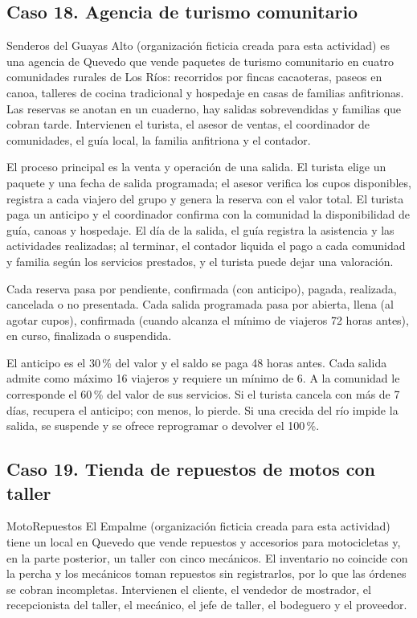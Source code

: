\documentclass[11pt]{article}
\newcommand{\subseccion}[1]{\subsection{\textcolor{midblue}{#1}}}
\begin{document}
\subseccion{Caso 18. Agencia de turismo comunitario}
Senderos del Guayas Alto (organización ficticia creada para esta actividad) es una agencia de Quevedo que vende paquetes de turismo comunitario en cuatro comunidades rurales de Los Ríos: recorridos por fincas cacaoteras, paseos en canoa, talleres de cocina tradicional y hospedaje en casas de familias anfitrionas. Las reservas se anotan en un cuaderno, hay salidas sobrevendidas y familias que cobran tarde. Intervienen el turista, el asesor de ventas, el coordinador de comunidades, el guía local, la familia anfitriona y el contador.

El proceso principal es la venta y operación de una salida. El turista elige un paquete y una fecha de salida programada; el asesor verifica los cupos disponibles, registra a cada viajero del grupo y genera la reserva con el valor total. El turista paga un anticipo y el coordinador confirma con la comunidad la disponibilidad de guía, canoas y hospedaje. El día de la salida, el guía registra la asistencia y las actividades realizadas; al terminar, el contador liquida el pago a cada comunidad y familia según los servicios prestados, y el turista puede dejar una valoración.

Cada reserva pasa por pendiente, confirmada (con anticipo), pagada, realizada, cancelada o no presentada. Cada salida programada pasa por abierta, llena (al agotar cupos), confirmada (cuando alcanza el mínimo de viajeros 72 horas antes), en curso, finalizada o suspendida.

El anticipo es el 30\,\% del valor y el saldo se paga 48 horas antes. Cada salida admite como máximo 16 viajeros y requiere un mínimo de 6. A la comunidad le corresponde el 60\,\% del valor de sus servicios. Si el turista cancela con más de 7 días, recupera el anticipo; con menos, lo pierde. Si una crecida del río impide la salida, se suspende y se ofrece reprogramar o devolver el 100\,\%.

\subseccion{Caso 19. Tienda de repuestos de motos con taller}
MotoRepuestos El Empalme (organización ficticia creada para esta actividad) tiene un local en Quevedo que vende repuestos y accesorios para motocicletas y, en la parte posterior, un taller con cinco mecánicos. El inventario no coincide con la percha y los mecánicos toman repuestos sin registrarlos, por lo que las órdenes se cobran incompletas. Intervienen el cliente, el vendedor de mostrador, el recepcionista del taller, el mecánico, el jefe de taller, el bodeguero y el proveedor.
\end{document}
